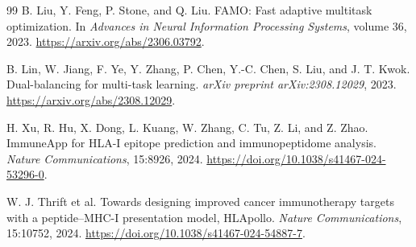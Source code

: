 \begin{thebibliography}{99}
B. Liu, Y. Feng, P. Stone, and Q. Liu.
\newblock FAMO: Fast adaptive multitask optimization.
\newblock In \emph{Advances in Neural Information Processing Systems}, volume 36, 2023.
\newblock \url{https://arxiv.org/abs/2306.03792}.

B. Lin, W. Jiang, F. Ye, Y. Zhang, P. Chen, Y.-C. Chen, S. Liu, and J. T. Kwok.
\newblock Dual-balancing for multi-task learning.
\newblock \emph{arXiv preprint arXiv:2308.12029}, 2023.
\newblock \url{https://arxiv.org/abs/2308.12029}.

H. Xu, R. Hu, X. Dong, L. Kuang, W. Zhang, C. Tu, Z. Li, and Z. Zhao.
\newblock ImmuneApp for HLA-I epitope prediction and immunopeptidome analysis.
\newblock \emph{Nature Communications}, 15:8926, 2024.
\newblock \url{https://doi.org/10.1038/s41467-024-53296-0}.

W. J. Thrift et al.
\newblock Towards designing improved cancer immunotherapy targets with a peptide--MHC-I presentation model, HLApollo.
\newblock \emph{Nature Communications}, 15:10752, 2024.
\newblock \url{https://doi.org/10.1038/s41467-024-54887-7}.

\end{thebibliography}
\endgroup
